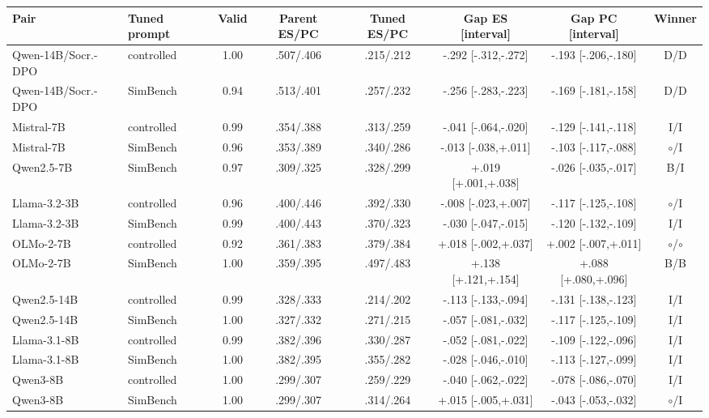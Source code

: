 \begin{table}[t]
\centering\scriptsize
\setlength{\tabcolsep}{4pt}
\begin{tabular}{@{}llcccccc@{}}
\toprule
Pair & Tuned prompt & Valid & Parent ES/PC & Tuned ES/PC & Gap ES [interval] & Gap PC [interval] & Winner \\
\midrule
Qwen-14B/Socr.-DPO & controlled & 1.00 & .507/.406 & .215/.212 & -.292 [-.312,-.272] & -.193 [-.206,-.180] & D/D \\
Qwen-14B/Socr.-DPO & SimBench & 0.94 & .513/.401 & .257/.232 & -.256 [-.283,-.223] & -.169 [-.181,-.158] & D/D \\
Mistral-7B & controlled & 0.99 & .354/.388 & .313/.259 & -.041 [-.064,-.020] & -.129 [-.141,-.118] & I/I \\
Mistral-7B & SimBench & 0.96 & .353/.389 & .340/.286 & -.013 [-.038,+.011] & -.103 [-.117,-.088] & $\circ$/I \\
Qwen2.5-7B & SimBench & 0.97 & .309/.325 & .328/.299 & +.019 [+.001,+.038] & -.026 [-.035,-.017] & B/I \\
Llama-3.2-3B & controlled & 0.96 & .400/.446 & .392/.330 & -.008 [-.023,+.007] & -.117 [-.125,-.108] & $\circ$/I \\
Llama-3.2-3B & SimBench & 0.99 & .400/.443 & .370/.323 & -.030 [-.047,-.015] & -.120 [-.132,-.109] & I/I \\
OLMo-2-7B & controlled & 0.92 & .361/.383 & .379/.384 & +.018 [-.002,+.037] & +.002 [-.007,+.011] & $\circ$/$\circ$ \\
OLMo-2-7B & SimBench & 1.00 & .359/.395 & .497/.483 & +.138 [+.121,+.154] & +.088 [+.080,+.096] & B/B \\
Qwen2.5-14B & controlled & 0.99 & .328/.333 & .214/.202 & -.113 [-.133,-.094] & -.131 [-.138,-.123] & I/I \\
Qwen2.5-14B & SimBench & 1.00 & .327/.332 & .271/.215 & -.057 [-.081,-.032] & -.117 [-.125,-.109] & I/I \\
Llama-3.1-8B & controlled & 0.99 & .382/.396 & .330/.287 & -.052 [-.081,-.022] & -.109 [-.122,-.096] & I/I \\
Llama-3.1-8B & SimBench & 1.00 & .382/.395 & .355/.282 & -.028 [-.046,-.010] & -.113 [-.127,-.099] & I/I \\
Qwen3-8B & controlled & 1.00 & .299/.307 & .259/.229 & -.040 [-.062,-.022] & -.078 [-.086,-.070] & I/I \\
Qwen3-8B & SimBench & 1.00 & .299/.307 & .314/.264 & +.015 [-.005,+.031] & -.043 [-.053,-.032] & $\circ$/I \\

\end{tabular}
\end{table}

